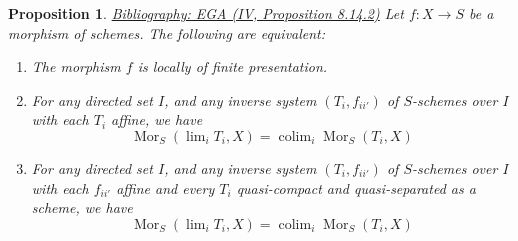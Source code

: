 \documentclass{amsart}
\newenvironment{reference}{\comment}{\endcomment}
\theoremstyle{plain}
\newtheorem{proposition}[subsection]{Proposition}
\theoremstyle{definition}
\theoremstyle{remark}
\numberwithin{equation}{subsection}
\def\lim{\mathop{\mathrm{lim}}\nolimits}
\def\colim{\mathop{\mathrm{colim}}\nolimits}
\def\Mor{\mathop{\mathrm{Mor}}\nolimits}
\begin{document}
\begin{proposition}
\label{proposition-characterize-locally-finite-presentation}
\begin{reference}
\href{https://stacks.math.columbia.edu/bibliography}{Bibliography: EGA (IV, Proposition 8.14.2)}
\end{reference}
Let $f : X \to S$ be a morphism of schemes.
The following are equivalent:
\begin{enumerate}
\item The morphism $f$ is locally of finite presentation.
\item For any directed set $I$, and any
inverse system $(T_i, f_{ii'})$ of $S$-schemes over $I$
with each $T_i$ affine, we have
$$
\Mor_S(\lim_i T_i, X) =
\colim_i \Mor_S(T_i, X)
$$
\item For any directed set $I$, and any
inverse system $(T_i, f_{ii'})$ of $S$-schemes over $I$
with each $f_{ii'}$ affine and every $T_i$ quasi-compact and
quasi-separated as a scheme, we have
$$
\Mor_S(\lim_i T_i, X) =
\colim_i \Mor_S(T_i, X)
$$
\end{enumerate}
\end{proposition}
\end{document}
